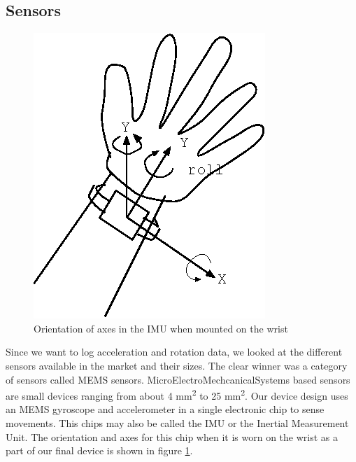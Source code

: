 \subsection{Sensors}
\begin{figure}
\begin{center}
\includegraphics{images/HandAxis.eps}
\caption{Orientation of axes in the IMU when mounted on the wrist}
\label{fig:AccAxis}
\end{center}
\end{figure}
Since we want to log acceleration and rotation data, we looked at the different sensors available in the market and their sizes. The clear winner was a category of sensors called MEMS sensors. MicroElectroMechcanicalSystems based sensors are small devices ranging from about 4 mm\textsuperscript{2} to  25 mm\textsuperscript{2}. Our device design uses an MEMS gyroscope and accelerometer in a single electronic chip to sense movements. This chips may also be called the IMU or the Inertial Measurement Unit. The orientation and axes for this chip when it is worn on the wrist as a part of our final device is shown in figure \ref{fig:AccAxis}.

